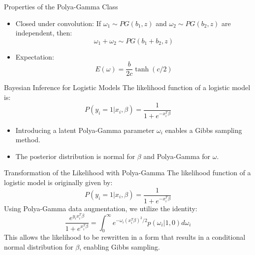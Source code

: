 \documentclass{beamer}
\begin{document}
	\begin{frame}{Properties of the Polya-Gamma Class}
		\begin{itemize}
			\item Closed under convolution: If $\omega_1 \sim PG(b_1, z)$ and $\omega_2 \sim PG(b_2, z)$ are independent, then:
			\begin{equation}
				\omega_1 + \omega_2 \sim PG(b_1 + b_2, z)
			\end{equation}
			\item Expectation:
			\begin{equation}
				E(\omega) = \frac{b}{2c} \tanh(c/2)
			\end{equation}
		\end{itemize}
	\end{frame}
	
	\begin{frame}{Bayesian Inference for Logistic Models}
		The likelihood function of a logistic model is:
		\begin{equation}
			P(y_i = 1 | x_i, \beta) = \frac{1}{1 + e^{-x_i^T \beta}}
		\end{equation}
		\begin{itemize}
			\item Introducing a latent Polya-Gamma parameter $\omega_i$ enables a Gibbs sampling method.
			\item The posterior distribution is normal for $\beta$ and Polya-Gamma for $\omega$.
		\end{itemize}
	\end{frame}
	
	\begin{frame}{Transformation of the Likelihood with Polya-Gamma}
		The likelihood function of a logistic model is originally given by:
		\begin{equation}
			P(y_i = 1 | x_i, \beta) = \frac{1}{1 + e^{-x_i^T \beta}}
		\end{equation}
		Using Polya-Gamma data augmentation, we utilize the identity:
		\begin{equation}
			\frac{e^{y_i x_i^T \beta}}{1 + e^{x_i^T \beta}} = \int_0^\infty e^{-\omega_i (x_i^T \beta)^2 / 2} p(\omega_i | 1, 0) d\omega_i
		\end{equation}
		This allows the likelihood to be rewritten in a form that results in a conditional normal distribution for $\beta$, enabling Gibbs sampling.
	\end{frame}
	
\end{document}

